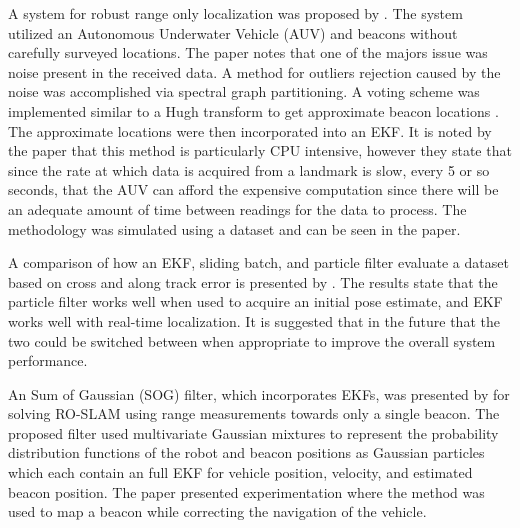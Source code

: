 \documentclass[conference]{IEEEtran}
\begin{document}
	A system for robust range only localization was proposed by \cite{Olson2006}. The system utilized an Autonomous Underwater Vehicle (AUV) and beacons without carefully surveyed locations. The paper notes that one of the majors issue was noise present in the received data. A method for outliers rejection caused by the noise was accomplished via spectral graph partitioning. A voting scheme was implemented similar to a Hugh transform to get approximate beacon locations \cite{Hough1959}. The approximate locations were then incorporated into an EKF. It is noted by the paper that this method is particularly CPU intensive, however they state that since the rate at which data is acquired from a landmark is slow, every 5 or so seconds, that the AUV can afford the expensive computation since there will be an adequate amount of time between readings for the data to process. The methodology was simulated using a dataset and can be seen in the paper.
	
	
	A comparison of how an EKF, sliding batch, and particle filter evaluate a dataset based on cross and along track error is presented by \cite{Kurth2003}. The results state that the particle filter works well when used to acquire an initial pose estimate, and EKF works well with real-time localization. It is suggested that in the future that the two could be switched between when appropriate to improve the overall system performance. 
	
	

	
	
	
	
	
	
	
	
	
	
	
	An Sum of Gaussian (SOG) filter, which incorporates EKFs, was presented by \cite{Vallicrosa2015} for solving RO-SLAM using range measurements towards only a single beacon. The proposed filter used multivariate Gaussian mixtures to represent the probability distribution functions of the robot and beacon positions as Gaussian particles which each contain an full EKF for vehicle position, velocity, and estimated beacon position. The paper presented experimentation where the method was used to map a beacon while correcting the navigation of the vehicle. 
	
\end{document}
